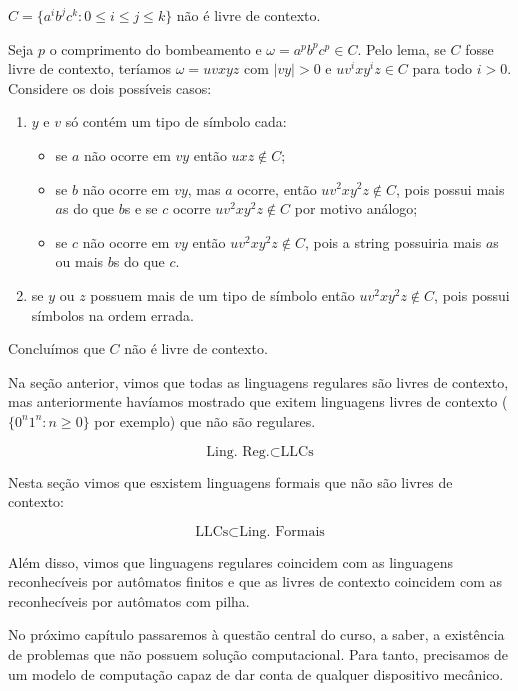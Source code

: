 \begin{example}
  $C = \{a^ib^jc^k : 0 \leq i \leq j \leq k\}$ não é livre de contexto.

  Seja $p$ o comprimento do bombeamento e $\omega = a^pb^pc^p \in C$.
  Pelo lema, se $C$ fosse livre de contexto, teríamos $\omega = uvxyz$ com $|vy| > 0$ e $uv^ixy^iz \in C$ para todo $i > 0$.
  Considere os dois possíveis casos:

  \begin{enumerate}
  \item $y$ e $v$ só contém um tipo de símbolo cada:
    \begin{itemize}
    \item se $a$ não ocorre em $vy$ então $uxz \notin C$;
    \item se $b$ não ocorre em $vy$, mas $a$ ocorre, então $uv^2xy^2z \notin C$, pois possui mais $a$s do que $b$s e se $c$ ocorre $uv^2xy^2z \notin C$ por motivo análogo;
    \item se $c$ não ocorre em $vy$ então $uv^2xy^2z \notin C$, pois a string possuiria mais $a$s ou mais $b$s do que $c$.
    \end{itemize}
  \item se $y$ ou $z$ possuem mais de um tipo de símbolo então $uv^2xy^2z \notin C$, pois possui símbolos na ordem errada.
  \end{enumerate}
  Concluímos que $C$ não é livre de contexto.
\end{example}

Na seção anterior, vimos que todas as linguagens regulares são livres de contexto, mas anteriormente havíamos mostrado que exitem linguagens livres de contexto ($\{0^n1^n: n \geq 0\}$ por exemplo) que não são regulares.

\begin{displaymath}
  \textrm{Ling. Reg.} \subset \textrm{LLCs}
\end{displaymath}

Nesta seção vimos que esxistem linguagens formais que não são livres de contexto:

\begin{displaymath}
  \textrm{LLCs} \subset \textrm{Ling. Formais}
\end{displaymath}

Além disso, vimos que linguagens regulares coincidem com as linguagens reconhecíveis por autômatos finitos e que as livres de contexto coincidem com as reconhecíveis por autômatos com pilha.

No próximo capítulo passaremos à questão central do curso, a saber, a existência de problemas que não possuem solução computacional.
Para tanto, precisamos de um modelo de computação capaz de dar conta de qualquer dispositivo mecânico.
